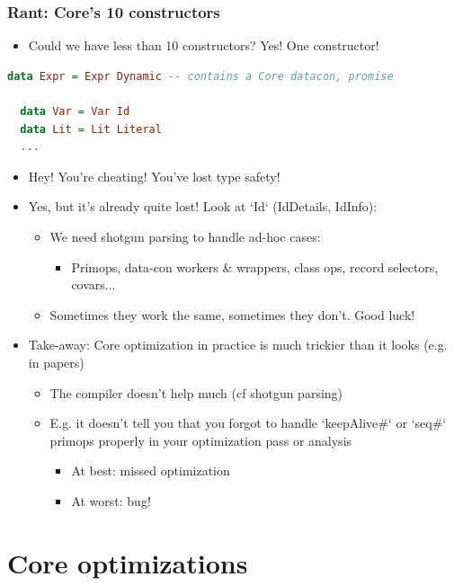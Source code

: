 \documentclass[aspectratio=169]{beamer}
\begin{document}
\begin{frame}[fragile]
  \frametitle{Rant: Core's 10 constructors}
  \begin{itemize}
    \item Could we have less than 10 constructors?
    \pause
     Yes! One constructor!
  \end{itemize}
  \begin{lstlisting}[language=haskell,basicstyle=\small]
  data Expr = Expr Dynamic -- contains a Core datacon, promise

  data Var = Var Id
  data Lit = Lit Literal
  ...
  \end{lstlisting}
  \pause
  \begin{itemize}
    \item Hey! You're cheating! You've lost type safety!
    \pause
    \item Yes, but it's already quite lost! Look at `Id` (IdDetails, IdInfo):
      \begin{itemize}
        \item We need shotgun parsing to handle ad-hoc cases:
        \begin{itemize}
          \item Primops, data-con workers \& wrappers, class ops, record
            selectors, covars...
        \end{itemize}
        \item Sometimes they work the same, sometimes they don't. Good luck!
      \end{itemize}
    \pause
    \item Take-away: Core optimization in practice is much trickier than it looks (e.g. in papers)
    \begin{itemize}
      \item The compiler doesn't help much (cf shotgun parsing)
      \item E.g. it doesn't tell you that you forgot to handle `keepAlive\#` or
        `seq\#` primops properly in your optimization pass or analysis
        \begin{itemize}
          \item At best: missed optimization
          \item At worst: bug!
        \end{itemize}
    \end{itemize}
  \end{itemize}
\end{frame}

\section{Core optimizations}
\end{document}
